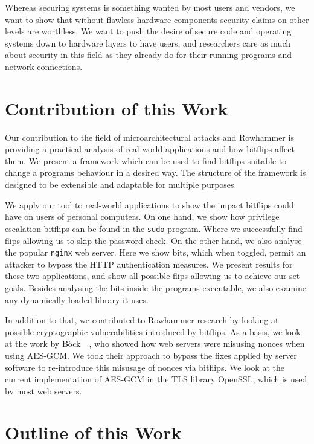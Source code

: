 Whereas securing systems is something wanted by most users and vendors, we want
to show that without flawless hardware components security claims on other
levels are worthless. We want to push the desire of secure code and operating
systems down to hardware layers to have users, and researchers care as much
about security in this field as they already do for their running programs and
network connections.

\section{Contribution of this Work}

Our contribution to the field of microarchitectural attacks and Rowhammer is
providing a practical analysis of real-world applications and how bitflips
affect them. We present a framework which can be used to find bitflips suitable
to change a program\textquotesingle s behaviour in a desired way. The structure
of the framework is designed to be extensible and adaptable for multiple
purposes.

We apply our tool to real-world applications to show the impact bitflips could
have on users of personal computers. On one hand, we show how privilege
escalation bitflips can be found in the \texttt{sudo} program. Where we
successfully find flips allowing us to skip the password check. On the other
hand, we also analyse the popular \texttt{nginx} web server. Here we show bits,
which when toggled, permit an attacker to bypass the HTTP authentication
measures. We present results for these two applications, and show all possible
flips allowing us to achieve our set goals. Besides analysing the bits inside
the program\textquotesingle s executable, we also examine any dynamically loaded
library it uses.

In addition to that, we contributed to Rowhammer research by looking at possible
cryptographic vulnerabilities introduced by bitflips. As a basis, we look at the
work by Böck~\etal~\cite{gcmnonceattack}, who showed how web servers were
misusing nonces when using AES-GCM. We took their approach to bypass the fixes
applied by server software to re-introduce this misusage of nonces via bitflips.
We look at the current implementation of AES-GCM in the TLS library OpenSSL,
which is used by most web servers.

\section{Outline of this Work}


